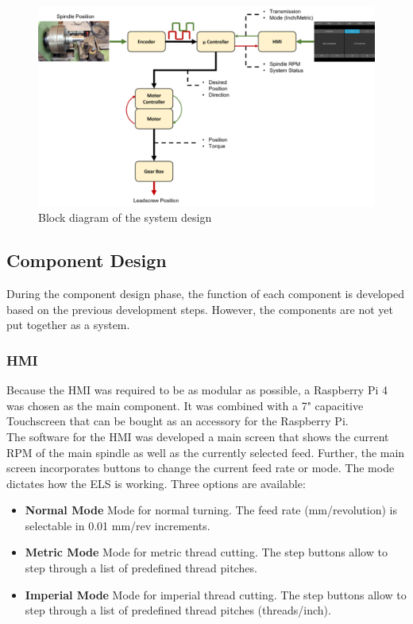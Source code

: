 \begin{figure}
    \begin{center}
    \includegraphics[width=12cm]{Pictures/SystemDesign.png}
    \caption[Block diagram of the system design]{Block diagram of the system design}
    \label{System design}
    \end{center}
\end{figure}
 
 
\subsection{Component Design}
During the component design phase, the function of each component is developed based on the previous development steps. However, the components are not yet put together as a system.
 
\subsubsection{HMI}
Because the HMI was required to be as modular as possible, a Raspberry Pi 4 was chosen as the main component. It was combined with a 7" capacitive Touchscreen that can be bought as an accessory for the Raspberry Pi.\\
The software for the HMI was developed a main screen that shows the current RPM of the main spindle as well as the currently selected feed. Further, the main screen incorporates buttons to change the current feed rate or mode. The mode dictates how the ELS is working. Three options are available:
 
\begin{itemize}
    \item \textbf{Normal Mode} Mode for normal turning. The feed rate (mm/revolution) is selectable in 0.01 mm/rev increments.
    \item \textbf{Metric Mode} Mode for metric thread cutting. The step buttons allow to step through a list of predefined thread pitches.
    \item \textbf{Imperial Mode} Mode for imperial thread cutting. The step buttons allow to step through a list of predefined thread pitches (threads/inch).
\end{itemize}
 
